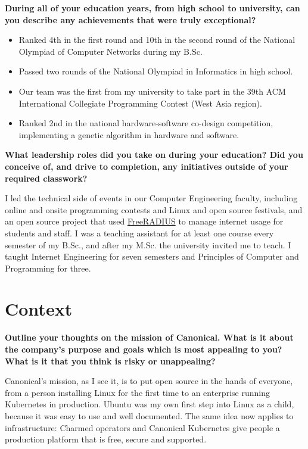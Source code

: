 \noindent
\textbf{During all of your education years, from high school to university, can you describe any achievements that were truly exceptional?}

\begin{itemize}
  \item Ranked 4th in the first round and 10th in the second round of the National Olympiad of Computer Networks during my B.Sc.
  \item Passed two rounds of the National Olympiad in Informatics in high school.
  \item Our team was the first from my university to take part in the 39th ACM International Collegiate Programming Contest (West Asia region).
  \item Ranked 2nd in the national hardware-software co-design competition, implementing a genetic algorithm in hardware and software.
\end{itemize}

\noindent
\textbf{What leadership roles did you take on during your education?
Did you conceive of, and drive to completion, any initiatives outside of your required classwork?}

I led the technical side of events in our Computer Engineering faculty, including online and onsite programming contests and Linux and open source
festivals, and an open source project that used \href{https://freeradius.org/}{FreeRADIUS} to manage internet usage for students and staff.
I was a teaching assistant for at least one course every semester of my B.Sc., and after my M.Sc. the university invited me to teach. I taught Internet
Engineering for seven semesters and Principles of Computer and Programming for three.

\section{Context}

\noindent
\textbf{Outline your thoughts on the mission of Canonical. What is it about the company's purpose and goals which is most appealing to you?
What is it that you think is risky or unappealing?}

Canonical's mission, as I see it, is to put open source in the hands of everyone, from a person installing Linux for the first time to an enterprise
running Kubernetes in production. Ubuntu was my own first step into Linux as a child, because it was easy to use and well documented. The same idea now
applies to infrastructure: Charmed operators and Canonical Kubernetes give people a production platform that is free, secure and supported.

